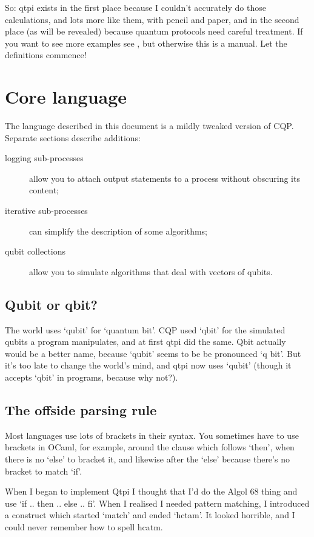 \documentclass[11pt,a4paper]{article}
\begin{document}
So: qtpi exists in the first place because I couldn't accurately do those calculations, and lots more like them, with pencil and paper, and in the second place (as will be revealed) because quantum protocols need careful treatment. If you want to see more examples see , but otherwise this is a manual. Let the definitions commence!

\section{Core language}

The language described in this document is a mildly tweaked version of CQP. Separate sections describe additions:  

\begin{description}
\item[logging sub-processes] allow you to attach output statements to a process without obscuring its content;  
\item[iterative sub-processes] can simplify the description of some algorithms;  
\item[qubit collections] allow you to simulate algorithms that deal with vectors of qubits.
\end{description}
 
\subsection{Qubit or qbit?}
The world uses `qubit' for `quantum bit'. CQP used `qbit' for the simulated qubits a program manipulates, and at first qtpi did the same. Qbit actually would be a better name, because `qubit' seems to be be pronounced `q bit'. But it's too late to change the world's mind, and qtpi now uses `qubit' (though it accepts `qbit' in programs, because why not?).

\subsection{The offside parsing rule}

Most languages use lots of brackets in their syntax. You sometimes have to use brackets in OCaml, for example, around the clause which follows `then', when there is no `else' to bracket it, and likewise after the `else' because there's no bracket to match `if'.

When I began to implement Qtpi I thought that I'd do the Algol 68 thing and use `if .. then .. else .. fi'. When I realised I needed pattern matching, I introduced a construct which started `match' and ended `hctam'. It looked horrible, and I could never remember how to spell hcatm.
\end{document}
